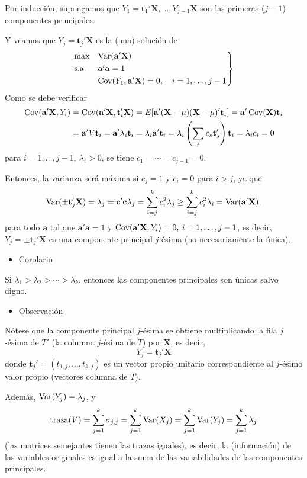 Por inducción, supongamos que $Y_1=\mathbf{t}_1'\mathbf{X},\dots,Y_{j-1}\mathbf{X}$ son las primeras ($j-1$) componentes principales.

Y veamos que $Y_j=\mathbf{t}_j'\mathbf{X}$ es la (una) solución de \[ \begin{rcases}
	\max & \operatorname{Var}(\mathbf{a'X})\\
	\text{s.a.} & \mathbf{a'a}=1\\
	&\operatorname{Cov}(Y_1,\mathbf{a'X})=0,\quad i=1,\dots,j-1
\end{rcases} \]
Como se debe verificar \begin{align*}
	\operatorname{Cov}(\mathbf{a'X},Y_i) & = \operatorname{Cov}(\mathbf{a'X},\mathbf{t}_i'\mathbf{X})=E[\mathbf{a'(X-\mu)(X-\mu)'t}_i]=\mathbf{a}'\operatorname{Cov}(\mathbf{X})\mathbf{t}_i\\
	&=\mathbf{a'}V\mathbf{t}_i=\mathbf{a'\lambda}_i\mathbf{t}_i=\lambda_i\mathbf{a't}_i=\lambda_i\left(\sum_sc_s\mathbf{t}_s'\right)\mathbf{t}_i=\lambda_ic_i=0
\end{align*} para $i=1,\dots,j-1,\:\lambda_i>0$, se tiene $c_1=\cdots=c_{j-1}=0$.

Entonces, la varianza será máxima si $c_j=1$ y $c_i=0$ para $i>j$, ya que \[ \operatorname{Var}(\pm\mathbf{t}_j'\mathbf{X})=\lambda_j=\mathbf{c'c}\lambda_j=\sum_{i=j}^{k}c_i^2\lambda_j\ge\sum_{i=j}^{k}c_i^2\lambda_i=\operatorname{Var}(\mathbf{a'X}), \] para todo $\mathbf{a}$ tal que $\mathbf{a'a}=1$ y $\operatorname{Cov}(\mathbf{a'X}, Y_i)=0,\:i=1,\dots,j-1$, es decir, $Y_j=\pm\mathbf{t}_j'\mathbf{X}$ es una componente principal $j$-ésima (no necesariamente la única).

\begin{itemize}[label=\color{red}\textbullet, leftmargin=*]
	\item \color{lightblue}Corolario
\end{itemize}
Si $\lambda_1>\lambda_2>\cdots>\lambda_k$, entonces las componentes principales son únicas salvo digno.
\begin{itemize}[label=\color{red}\textbullet, leftmargin=*]
	\item \color{lightblue}Observación
\end{itemize}
Nótese que la componente principal $j$-ésima se obtiene multiplicando la fila $j$-ésima de $T'$ (la columna $j$-ésima de $T$) por $\mathbf{X}$, es decir, \[ Y_j=\mathbf{t}_j'\mathbf{X} \]donde $\mathbf{t}_j'=(t_{1,j},\dots,t_{k,j})$ es un vector propio unitario correspondiente al $j$-ésimo valor propio (vectores columna de $T$).

Además, $\operatorname{Var}(Y_j)=\lambda_j$, y \[ \mathrm{traza}(V)=\sum_{j=1}^{k}\sigma_{j,j}=\sum_{j=1}^{k}\operatorname{Var}(X_j)=\sum_{j=1}^{k}\operatorname{Var}(Y_j)=\sum_{j=1}^{k}\lambda_j \](las matrices semejantes tienen las trazas iguales), es decir, la  (información) de las variables originales es igual a la suma de las variabilidades de las componentes principales.

